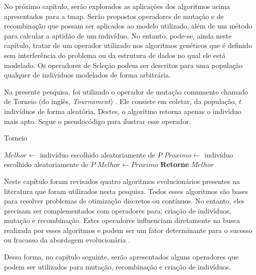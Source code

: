 No próximo capítulo, serão explorados as aplicações dos algoritmos acima 
apresentados para a \ac{tmap}. Serão propostos operadores de mutação e de 
recombinação que possam ser aplicados ao modelo utilizado, além de um método 
para calcular a aptidão de um indivíduo. No entanto, pode-se, ainda neste 
capítulo, tratar de um operador utilizado nos algoritmos genéticos que é 
definido sem interferência do problema ou da estrutura de dados no qual ele 
está modelado. Os operadores de Seleção podem ser descritos para uma população 
qualquer de indivíduos modelados de forma arbitrária.

Na presente pesquisa, foi utilizado o operador de mutação comumente chamado de 
Torneio (do inglês, \textit{Tournament}) \citep{Luke2013Metaheuristics}. Ele 
consiste em coletar, da população, $t$ indivíduos de forma aleatória. Destes, 
o algoritmo retorna apenas o indivíduo mais apto. Segue o pseudocódigo para 
ilustrar esse operador.

\begin{algorithm}[h]                      %
	\caption{Torneio}          %
	\label{torneio}                           %
	\begin{algorithmic}                    %
		\State $Melhor \gets $ indivíduo escolhido aleatoriamente de $P$ 
			\State $Proximo \gets $ indivíduo escolhido aleatoriamente de $P$
				\State $Melhor \gets Proximo$
			\EndIf
		\EndFor
		\State \textbf{Retorne} $Melhor$
		\EndProcedure
	\end{algorithmic}
\end{algorithm}

Neste capítulo foram revisados quatro algoritmos evolucionários presentes na 
literatura que foram utilizados nesta pesquisa. Todos esses algoritmos são bases 
para resolver problemas de otimização discretos ou contínuos. No entanto, eles 
precisam ser complementados com operadores para: criação de indivíduos, mutação 
e recombinação. Estes operadores influenciam diretamente na busca realizada por 
esses algoritmos e podem ser um fator determinante para o sucesso ou fracasso da 
abordagem evolucionária \citep{Luke2013Metaheuristics}.

Dessa forma, no capítulo seguinte, serão apresentados alguns operadores que 
podem ser utilizados para mutação, recombinação e criação de indivíduos.